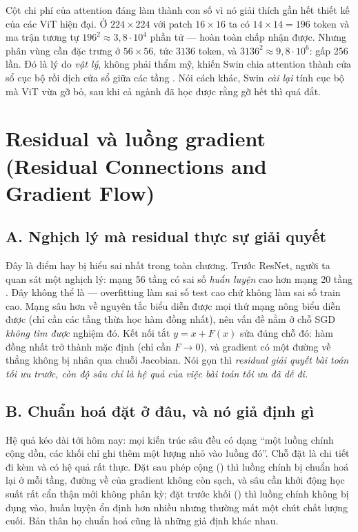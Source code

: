 \documentclass[../../deep_learning.tex]{subfiles}
\begin{document}
Cột chi phí của attention đáng làm thành con số vì nó giải thích gần hết thiết kế của các ViT hiện đại. Ở \(224\times224\) với patch \(16\times16\) ta có \(14\times14 = 196\) token và ma trận tương tự \(196^2 \approx 3{,}8\cdot10^{4}\) phần tử --- hoàn toàn chấp nhận được. Nhưng phân vùng cần đặc trưng ở \(56\times56\), tức \(3136\) token, và \(3136^2 \approx 9{,}8\cdot10^{6}\): gấp 256 lần. Đó là lý do \emph{vật lý}, không phải thẩm mỹ, khiến Swin chia attention thành cửa sổ cục bộ rồi dịch cửa sổ giữa các tầng \cite{liu2021swin}. Nói cách khác, Swin \emph{cài lại} tính cục bộ mà ViT vừa gỡ bỏ, sau khi cả ngành đã học được rằng gỡ hết thì quá đắt. 

\section{Residual và luồng gradient (Residual Connections and Gradient Flow)}

\subsection{A. Nghịch lý mà residual thực sự giải quyết}

Đây là điểm hay bị hiểu sai nhất trong toàn chương. Trước ResNet, người ta quan sát một nghịch lý: mạng 56 tầng có sai số \emph{huấn luyện} cao hơn mạng 20 tầng \cite{he2016resnet}. Đây không thể là  --- overfitting làm sai số test cao chứ không làm sai số train cao. Mạng sâu hơn về nguyên tắc biểu diễn được mọi thứ mạng nông biểu diễn được (chỉ cần các tầng thừa học hàm đồng nhất), nên vấn đề nằm ở chỗ SGD \emph{không tìm được} nghiệm đó. Kết nối tắt \(y = x + F(x)\) sửa đúng chỗ đó: hàm đồng nhất trở thành mặc định (chỉ cần \(F \to 0\)), và gradient có một đường về thẳng không bị nhân qua chuỗi Jacobian. Nói gọn thì \emph{residual giải quyết bài toán tối ưu trước, còn độ sâu chỉ là hệ quả của việc bài toán tối ưu đã dễ đi.}

\subsection{B. Chuẩn hoá đặt ở đâu, và nó giả định gì}

Hệ quả kéo dài tới hôm nay: mọi kiến trúc sâu đều có dạng ``một luồng chính cộng dồn, các khối chỉ ghi thêm một lượng nhỏ vào luồng đó''. Chỗ đặt  là chi tiết đi kèm và có hệ quả rất thực. Đặt sau phép cộng () thì luồng chính bị chuẩn hoá lại ở mỗi tầng, đường về của gradient không còn sạch, và  sâu cần khởi động học suất rất cẩn thận mới không phân kỳ; đặt trước khối () thì luồng chính không bị đụng vào, huấn luyện ổn định hơn nhiều nhưng thường mất một chút chất lượng cuối. Bản thân họ chuẩn hoá cũng là những giả định khác nhau.
\end{document}
